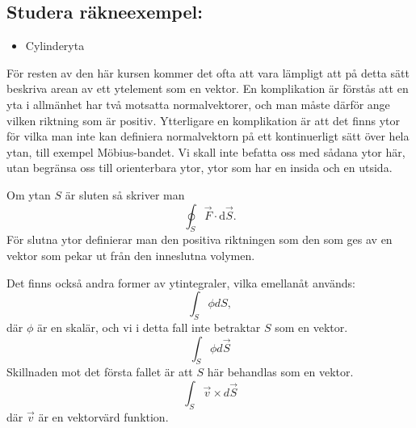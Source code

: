 \documentclass[%
oneside,                 %
final,                   %
10pt]{article}
\newenvironment{warning_mdfboxadmon}[1][]{
\begin{warning_mdfboxmdframed}[frametitle=#1]
}
{
\end{warning_mdfboxmdframed}
}
\begin{document}
\subsection*{Studera räkneexempel:}
\begin{itemize}
\item Cylinderyta
\end{itemize}

\noindent

\begin{warning_mdfboxadmon}[Kommentar]
För resten av den här kursen kommer det ofta att vara lämpligt att på detta sätt beskriva arean av ett ytelement som en vektor.  En komplikation är förstås att en yta i allmänhet har två motsatta normalvektorer, och man måste därför ange vilken riktning som är positiv. Ytterligare en komplikation är att det finns ytor för vilka man inte kan definiera normalvektorn på ett kontinuerligt sätt över hela ytan, till exempel Möbius-bandet.  Vi skall inte befatta oss med sådana ytor här, utan begränsa oss till orienterbara ytor, ytor som har en insida och en utsida.
\end{warning_mdfboxadmon} %



Om ytan $S$ är sluten så skriver man
\begin{equation}
  \oint_S \vec{F} \cdot \mbox{d}\vec{S}.
\end{equation}
För slutna ytor definierar man den positiva riktningen som den som ges av en vektor som pekar ut från den inneslutna volymen.

Det finns också andra former av ytintegraler, vilka emellanåt används:
\begin{equation}
  \int_S \phi dS,
\end{equation}
där $\phi$ är en skalär, och vi i detta fall inte betraktar $S$ som en 
vektor.
\begin{equation}
  \int_S \phi d\vec{S}
\end{equation}
Skillnaden mot det första fallet är att $S$ här behandlas som en vektor.
\begin{equation}
  \int_S \vec{v} \times d\vec{S}
\end{equation}
där $\vec{v}$ är en vektorvärd funktion.
\end{document}
